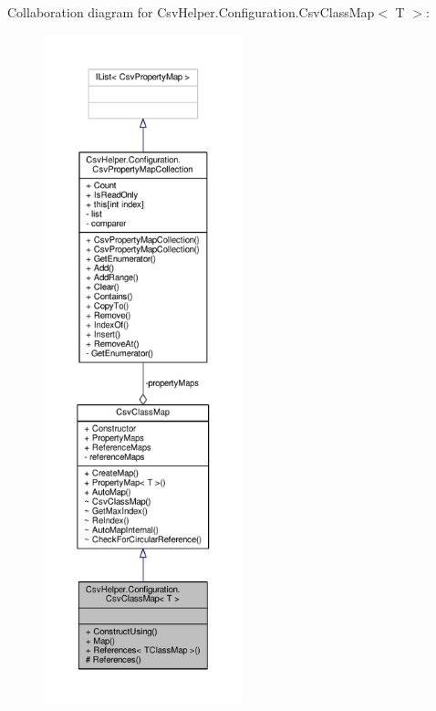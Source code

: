 Collaboration diagram for Csv\-Helper.\-Configuration.\-Csv\-Class\-Map$<$ T $>$\-:
\nopagebreak
\begin{figure}[H]
\begin{center}
\leavevmode
\includegraphics[height=550pt]{a00451}
\end{center}
\end{figure}
